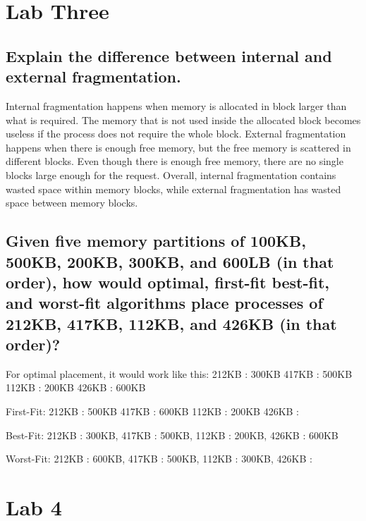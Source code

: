 \documentclass[letterpaper, 10pt,DIV=13]{scrartcl}
\numberwithin{equation}{section} %
\numberwithin{figure}{section} %
\numberwithin{table}{section} %
\begin{document}
\pagebreak
\section{Lab Three}
\subsection{Explain	the	difference	between	internal and external fragmentation.}
Internal fragmentation happens when memory is allocated in block larger than what is required. The memory that is not used inside the allocated block becomes useless if the process does not require the whole block. External fragmentation happens when there is enough free memory, but the free memory is scattered in different blocks. Even though there is enough free memory, there are no single blocks large enough for the request. 
Overall, internal fragmentation contains wasted space within memory blocks, while external fragmentation has wasted space between memory blocks. 
\subsection{Given five memory partitions of 100KB, 500KB, 200KB, 300KB, and 600LB (in that order), how would optimal, first-fit best-fit, and worst-fit algorithms place processes of 212KB, 417KB, 112KB, and 426KB (in that order)?}

For optimal placement, it would work like this: 
212KB : 300KB 
417KB : 500KB 
112KB : 200KB 
426KB : 600KB 

First-Fit: 
212KB : 500KB 
417KB : 600KB 
112KB : 200KB 
426KB : 

Best-Fit: 
212KB : 300KB, 
417KB : 500KB, 
112KB : 200KB, 
426KB : 600KB 

Worst-Fit: 
212KB : 600KB, 
417KB : 500KB, 
112KB : 300KB, 
426KB : 





\pagebreak

\section{Lab 4}
\end{document}
